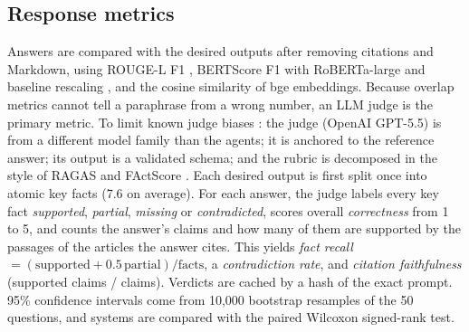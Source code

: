 \subsection{Response metrics}
Answers are compared with the desired outputs after removing citations and Markdown, using ROUGE-L F1
\cite{lin2004rouge}, BERTScore F1 with RoBERTa-large and baseline rescaling \cite{zhang2020bertscore}, and the
cosine similarity of bge embeddings. Because overlap metrics cannot tell a paraphrase from a wrong number,
an LLM judge is the primary metric. To limit known judge biases \cite{zheng2023judge}: the judge (OpenAI
GPT-5.5) is from a different model family than the agents; it is anchored to the reference answer; its
output is a validated schema; and the rubric is decomposed in the style of RAGAS and FActScore
\cite{es2024ragas, min2023factscore}. Each desired output is first split once into atomic key facts
(7.6 on average). For each answer, the judge labels every key fact \emph{supported}, \emph{partial},
\emph{missing} or \emph{contradicted}, scores overall \emph{correctness} from 1 to 5, and counts the answer's
claims and how many of them are supported by the passages of the articles the answer cites. This yields
\emph{fact recall} $=(\text{supported}+0.5\,\text{partial})/\text{facts}$, a \emph{contradiction rate},
and \emph{citation faithfulness} (supported claims / claims). Verdicts are cached by a hash of the exact
prompt. 95\% confidence intervals come from 10{,}000 bootstrap resamples of the 50 questions, and systems
are compared with the paired Wilcoxon signed-rank test.
